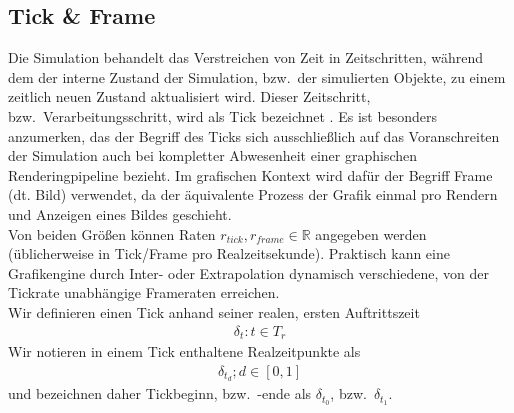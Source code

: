 \subsection{Tick \& Frame}
Die Simulation behandelt das Verstreichen von Zeit in Zeitschritten, während dem der interne Zustand der Simulation, bzw.~der simulierten Objekte, zu einem zeitlich neuen Zustand aktualisiert wird.
Dieser Zeitschritt, bzw.~Verarbeitungsschritt, wird als Tick bezeichnet \cite{tick}.
Es ist besonders anzumerken, das der Begriff des Ticks sich ausschließlich auf das Voranschreiten der Simulation auch bei kompletter Abwesenheit einer graphischen Renderingpipeline bezieht. Im grafischen Kontext wird dafür der Begriff Frame (dt. Bild) verwendet, da der äquivalente Prozess der Grafik einmal pro Rendern und Anzeigen eines Bildes geschieht.\\
Von beiden Größen können Raten $r_{tick}, r_{frame} \in \mathbb{R}$ angegeben werden (üblicherweise in Tick/Frame pro Realzeitsekunde). Praktisch kann eine Grafikengine durch Inter- oder Extrapolation dynamisch verschiedene, von der Tickrate unabhängige Frameraten erreichen.\\
Wir definieren einen Tick anhand seiner realen, ersten Auftrittszeit
\begin{align}
\delta_t: t \in T_r
\end{align}
Wir notieren in einem Tick enthaltene Realzeitpunkte als
\begin{align}\label{m:tickinterval}
\delta_{t_d}; d \in [0,1]
\end{align}
und bezeichnen daher Tickbeginn, bzw.~-ende als $\delta_{t_0}$, bzw.~$\delta_{t_1}$. 

